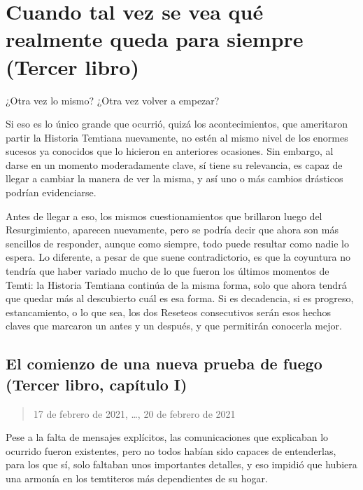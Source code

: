 \documentclass[
]{book}
\begin{document}
\hypertarget{cuando-tal-vez-se-vea-quuxe9-realmente-queda-para-siempre-tercer-libro}{%
\chapter{Cuando tal vez se vea qué realmente queda para siempre (Tercer libro)}\label{cuando-tal-vez-se-vea-quuxe9-realmente-queda-para-siempre-tercer-libro}}

¿Otra vez lo mismo? ¿Otra vez volver a empezar?

Si eso es lo único grande que ocurrió, quizá los acontecimientos, que ameritaron partir la Historia Temtiana nuevamente, no estén al mismo nivel de los enormes sucesos ya conocidos que lo hicieron en anteriores ocasiones. Sin embargo, al darse en un momento moderadamente clave, sí tiene su relevancia, es capaz de llegar a cambiar la manera de ver la misma, y así uno o más cambios drásticos podrían evidenciarse.

Antes de llegar a eso, los mismos cuestionamientos que brillaron luego del Resurgimiento, aparecen nuevamente, pero se podría decir que ahora son más sencillos de responder, aunque como siempre, todo puede resultar como nadie lo espera. Lo diferente, a pesar de que suene contradictorio, es que la coyuntura no tendría que haber variado mucho de lo que fueron los últimos momentos de Temti: la Historia Temtiana continúa de la misma forma, solo que ahora tendrá que quedar más al descubierto cuál es esa forma. Si es decadencia, si es progreso, estancamiento, o lo que sea, los dos Reseteos consecutivos serán esos hechos claves que marcaron un antes y un después, y que permitirán conocerla mejor.

\hypertarget{el-comienzo-de-una-nueva-prueba-de-fuego-tercer-libro-capuxedtulo-i}{%
\section{El comienzo de una nueva prueba de fuego (Tercer libro, capítulo I)}\label{el-comienzo-de-una-nueva-prueba-de-fuego-tercer-libro-capuxedtulo-i}}

\begin{quote}
17 de febrero de 2021, \ldots, 20 de febrero de 2021
\end{quote}

Pese a la falta de mensajes explícitos, las comunicaciones que explicaban lo ocurrido fueron existentes, pero no todos habían sido capaces de entenderlas, para los que sí, solo faltaban unos importantes detalles, y eso impidió que hubiera una armonía en los temtiteros más dependientes de su hogar.
\end{document}
